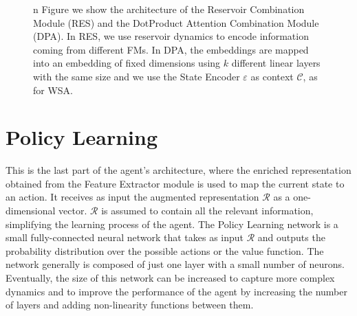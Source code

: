 \begin{figure}[ht]
    \caption{n Figure we show the architecture of the Reservoir Combination Module (RES) and the DotProduct Attention Combination Module (DPA). In RES, we use reservoir dynamics to encode information coming from different FMs. In DPA, the embeddings are mapped into an embedding of fixed dimensions using $k$ different linear layers with the same size and we use the State Encoder $\varepsilon$ as context $\mathcal{C}$, as for WSA.}
    \label{fig:dpa_combination}
\end{figure}



\section{Policy Learning}\label{sec:policy_learning}
This is the last part of the agent's architecture, where the enriched representation obtained from the Feature Extractor module is used to map the current state to an action.
It receives as input the augmented representation $\mathcal{R}$ as a one-dimensional vector.
$\mathcal{R}$ is assumed to contain all the relevant information, simplifying the learning process of the agent.
The Policy Learning network is a small fully-connected neural network that takes as input $\mathcal{R}$ and outputs the probability distribution over the possible actions or the value function.
The network generally is composed of just one layer with a small number of neurons.
Eventually, the size of this network can be increased to capture more complex dynamics and to improve the performance of the agent by increasing the number of layers and adding non-linearity functions between them.